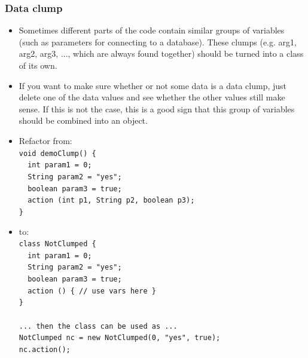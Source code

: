 \documentclass{article}
\begin{document}
\subsubsection{Data clump}
\begin{itemize}
    \item Sometimes different parts of the code contain similar groups of variables (such as parameters for connecting to a database). These clumps (e.g. arg1, arg2, arg3, ..., which are always found together) should be turned into a class of its own.
    \item If you want to make sure whether or not some data is a data clump, just delete one of the data values and see whether the other values still make sense. If this is not the case, this is a good sign that this group of variables should be combined into an object.
    \item Refactor from:\\
        \lstinline|void demoClump() {|\\
        \lstinline|  int param1 = 0;|\\
        \lstinline|  String param2 = "yes";|\\
        \lstinline|  boolean param3 = true;|\\
        \lstinline|  action (int p1, String p2, boolean p3);|\\
        \lstinline|}|\\
    \item to:\\
        \lstinline|class NotClumped {|\\
        \lstinline|  int param1 = 0;|\\
        \lstinline|  String param2 = "yes";|\\
        \lstinline|  boolean param3 = true;|\\
        \lstinline|  action () { // use vars here }|\\
        \lstinline|}|\\\\
        \lstinline|... then the class can be used as ...|\\
        \lstinline|NotClumped nc = new NotClumped(0, "yes", true);|\\
        \lstinline|nc.action();|\\
\end{itemize}
\end{document}
